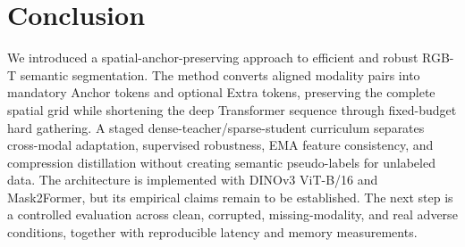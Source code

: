 \documentclass[10pt,twocolumn,letterpaper]{article}
\newif\ifcvprformat
\begin{document}
\section{Conclusion}

We introduced a spatial-anchor-preserving approach to efficient and robust RGB-T semantic segmentation.
The method converts aligned modality pairs into mandatory Anchor tokens and optional Extra tokens, preserving the complete spatial grid while shortening the deep Transformer sequence through fixed-budget hard gathering.
A staged dense-teacher/sparse-student curriculum separates cross-modal adaptation, supervised robustness, EMA feature consistency, and compression distillation without creating semantic pseudo-labels for unlabeled data.
The architecture is implemented with DINOv3 ViT-B/16 and Mask2Former, but its empirical claims remain to be established.
The next step is a controlled evaluation across clean, corrupted, missing-modality, and real adverse conditions, together with reproducible latency and memory measurements.

\ifcvprformat
  
\else
  
\fi

\end{document}
